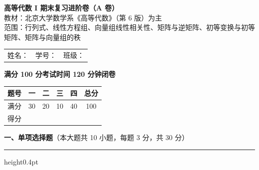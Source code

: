 \documentclass[12pt]{ctexart}
\newcommand{\blank}[1][2.6cm]{\underline{\hspace{#1}}}
\newcommand{\bigsection}[2]{%
  \vspace{7pt}%
  {\noindent\bfseries\large #1}\hfill{\normalsize（本大题共 #2）}\par
  \vspace{2pt}\hrule height0.4pt\vspace{8pt}}
\begin{document}
\begin{center}
  {\Large\bfseries 高等代数 I 期末复习进阶卷（A 卷）}\\[4pt]
  {\small 教材：北京大学数学系《高等代数》（第 6 版）为主\\
  范围：行列式、线性方程组、向量组线性相关性、矩阵与逆矩阵、初等变换与初等矩阵、矩阵与向量组的秩}\\[8pt]
\end{center}

\noindent
\begin{tabular}{@{}p{4.6cm}p{4.6cm}p{4.6cm}@{}}
姓名：\blank[2.8cm] & 学号：\blank[2.8cm] & 班级：\blank[2.8cm]
\end{tabular}

\vspace{6pt}
\noindent\textbf{满分 100 分\qquad 考试时间 120 分钟\qquad 闭卷}

\vspace{8pt}
\noindent
\renewcommand{\arraystretch}{1.4}
\begin{tabular}{|c|c|c|c|c|c|}
\hline
题号 & 一 & 二 & 三 & 四 & 总分 \\\hline
满分 & 30 & 20 & 10 & 40 & 100 \\\hline
得分 & & & & & \\\hline
\end{tabular}

\vspace{12pt}

\bigsection{一、单项选择题}{10 小题，每题 3 分，共 30 分}
\end{document}
